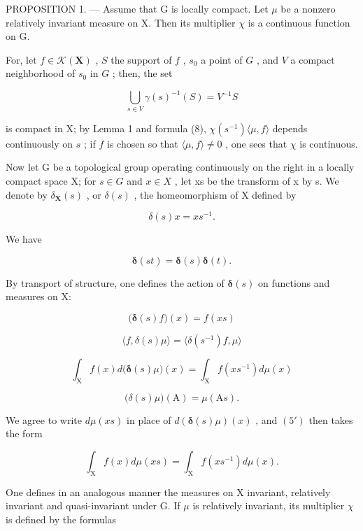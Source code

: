 PROPOSITION 1. --- Assume that G is locally compact. Let \(\mu\) be a nonzero relatively invariant measure on X. Then its multiplier \(\chi\) is a continuous function on G.

For, let \(f \in \mathcal{K}(\mathbf{X})\) , \(S\) the support of \(f\) , \(s_0\) a point of \(G\) , and \(V\) a compact neighborhood of \(s_0\) in \(G\) ; then, the set

\[
\bigcup_ {s \in V} \gamma (s) ^ {- 1} (S) = V ^ {- 1} S
\]

is compact in X; by Lemma 1 and formula (8), \(\chi(s^{-1})\langle\mu, f\rangle\) depends continuously on \(s\) ; if \(f\) is chosen so that \(\langle\mu, f\rangle \neq 0\) , one sees that \(\chi\) is continuous.

Now let G be a topological group operating continuously on the right in a locally compact space X; for \(s \in G\) and \(x \in X\) , let xs be the transform of x by s. We denote by \(\delta_{\mathbf{X}}(s)\) , or \(\delta(s)\) , the homeomorphism of X defined by

\[
\delta (s) x = x s ^ {- 1}.\tag{1'}
\]

We have

\[
\boldsymbol {\delta} (s t) = \boldsymbol {\delta} (s) \boldsymbol {\delta} (t).\tag{2'}
\]

By transport of structure, one defines the action of \(\boldsymbol{\delta}(s)\) on functions and measures on X:



\[
\big (\boldsymbol {\delta} (s) f \big) (x) = f (x s)\tag{3'}
\]

\[
\langle f, \delta (s) \mu \rangle = \langle \delta (s ^ {- 1}) f, \mu \rangle\tag{4'}
\]

\[
\int_ {\mathrm{X}} f (x) d \bigl (\pmb {\delta} (s) \mu \bigr) (x) = \int_ {\mathrm{X}} f (x s ^ {- 1}) d \mu (x)\tag{5'}
\]

\[
\big (\delta (s) \mu \big) (\mathrm{A}) = \mu (\mathrm{A} s).\tag{6'}
\]

We agree to write \(d\mu(xs)\) in place of \(d(\pmb{\delta}(s)\mu)(x)\) , and \((5')\) then takes the form

\[
\int_ {\mathrm{X}} f (x) d \mu (x s) = \int_ {\mathrm{X}} f (x s ^ {- 1}) d \mu (x).
\]

One defines in an analogous manner the measures on X invariant, relatively invariant and quasi-invariant under G. If \(\mu\) is relatively invariant, its multiplier \(\chi\) is defined by the formulas



